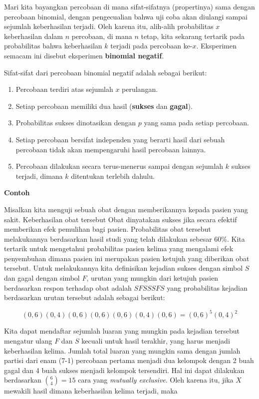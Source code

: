 \documentclass[]{book}
\providecommand{\tightlist}{%
  \setlength{\itemsep}{0pt}\setlength{\parskip}{0pt}}
\begin{document}
Mari kita bayangkan percobaan di mana sifat-sifatnya (propertinya) sama
dengan percobaan binomial, dengan pengecualian bahwa uji coba akan
diulangi sampai sejumlah keberhasilan terjadi. Oleh karena itu,
alih-alih probabilitas \(x\) keberhasilan dalam \(n\) percobaan, di mana
\(n\) tetap, kita sekarang tertarik pada probabilitas bahwa keberhasilan
\(k\) terjadi pada percobaan ke-\(x\). Eksperimen semacam ini disebut
eksperimen \textbf{binomial negatif}.

Sifat-sifat dari percobaan binomial negatif adalah sebagai berikut:

\begin{enumerate}
\def\labelenumi{\arabic{enumi}.}
\tightlist
\item
  Percobaan terdiri atas sejumlah \(x\) perulangan.
\item
  Setiap percobaan memiliki dua hasil (\textbf{sukses} dan
  \textbf{gagal}).
\item
  Probabilitas sukses dinotasikan dengan \(p\) yang sama pada setiap
  percobaan.
\item
  Setiap percobaan bersifat independen yang berarti hasil dari sebuah
  percobaan tidak akan mempengaruhi hasil percobaan lainnya.
\item
  Percobaan dilakukan secara terus-menerus sampai dengan sejumlah \(k\)
  sukses terjadi, dimana \(k\) ditentukan terlebih dahulu.
\end{enumerate}

\textbf{Contoh}

Misalkan kita menguji sebuah obat dengan memberikannya kepada pasien
yang sakit. Keberhasilan obat tersebut Obat dinyatakan sukses jika
secara efektif memberikan efek pemulihan bagi pasien. Probabilitas obat
tersebut melakukannya berdasarkan hasil studi yang telah dilakukan
sebesar 60\%. Kita tertarik untuk mengetahui probabilitas pasien kelima
yang mengalami efek penyembuhan dimana pasien ini merupakan pasien
ketujuh yang diberikan obat tersebut. Untuk melakukannya kita
definisikan kejadian sukses dengan simbol \(S\) dan gagal dengan simbol
\(F\), urutan yang mungkin dari ketujuh pasien berdasarkan respon
terhadap obat adalah \(SFSSSFS\) yang probabilitas kejadian berdasarkan
urutan tersebut adalah sebagai berikut:

\[
\left(0,6\right)\left(0,4\right)\left(0,6\right)\left(0,6\right)\left(0,6\right)\left(0,4\right)\left(0,6\right)=\left(0,6\right)^5\left(0,4\right)^2
\]

Kita dapat mendaftar sejumlah luaran yang mungkin pada kejadian tersebut
mengatur ulang \(F\) dan \(S\) kecuali untuk hasil terakhir, yang harus
menjadi keberhasilan kelima. Jumlah total luaran yang mungkin sama
dengan jumlah partisi dari enam (7-1) percobaan pertama menjadi dua
kelompok dengan 2 buah gagal dan 4 buah sukses menjadi kelompok
tersendiri. Hal ini dapat dilakukan berdasarkan \(\binom{6}{4}=15\) cara
yang \emph{mutually exclusive}. Oleh karena itu, jika \(X\) mewakili
hasil dimana keberhasilan kelima terjadi, maka
\end{document}
